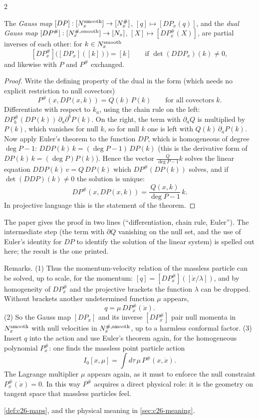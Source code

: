\begin{paracol}{2}
\begin{theorem}\label{thm:c29-gauss}
The \emph{Gauss map} $[DP]:[N^{\rm smooth}_x]\to[N^\#_x]$, $[q]\mapsto[DP_x(q)]$, and the \emph{dual Gauss map} $[DP^\#]:[N_x^{\#,\rm smooth}]\to[N_x]$, $[X]\mapsto[DP^\#_x(X)]$, are partial inverses of each other: for $k\in N^{\rm smooth}_x$
\[
  [DP^\#_x]\bigl([DP_x]([k])\bigr)=[k]\qquad\text{if }\det(DDP_x)(k)\ne0,
\]
and likewise with $P$ and $P^\#$ exchanged.
\end{theorem}
\begin{proof}
Write the defining property of the dual in the form (which needs no explicit restriction to null covectors)
\[
  P^\#(x,DP(x,k))=Q(k)\,P(k)\qquad\text{for all covectors }k.
\]
Differentiate with respect to $k_a$, using the chain rule on the left: $DP^\#_b(DP(k))\,\partial_a\partial^bP(k)$. On the right, the term with $\partial_aQ$ is multiplied by $P(k)$, which vanishes for null $k$, so for null $k$ one is left with $Q(k)\,\partial_aP(k)$. Now apply Euler's theorem to the function $DP$, which is homogeneous of degree $\deg P-1$: $DDP(k)\,k=(\deg P-1)\,DP(k)$ (this is the derivative form of $DP(k)\,k=(\deg P)P(k)$). Hence the vector $\frac{Q}{\deg P-1}k$ solves the linear equation $DDP(k)\,v=Q\,DP(k)$ which $DP^\#(DP(k))$ solves, and if $\det(DDP)(k)\ne0$ the solution is unique:
\[
  DP^\#(x,DP(x,k))=\frac{Q(x,k)}{\deg P-1}\,k.
\]
In projective language this is the statement of the theorem.
\end{proof}
\begin{coursenote}
The paper gives the proof in two lines (``differentiation, chain rule, Euler''). The intermediate step (the term with $\partial Q$ vanishing on the null set, and the use of Euler's identity for $DP$ to identify the solution of the linear system) is spelled out here; the result is the one printed.
\end{coursenote}

Remarks. (1) Thus the momentum-velocity relation of the massless particle can be solved, up to scale, for the momentum: $[q]=[DP^\#_x]([\dot x/\lambda])$, and by homogeneity of $DP^\#_x$ and the projective brackets the function $\lambda$ can be dropped. Without brackets another undetermined function $\mu$ appears,
\[
  q=\mu\,DP^\#_x(\dot x).
\]
(2) So the Gauss map $[DP_x]$ and its inverse $[DP^\#_x]$ pair null momenta in $N^{\rm smooth}_x$ with null velocities in $N^{\#,\rm smooth}_x$, up to a harmless conformal factor. (3) Insert $q$ into the action and use Euler's theorem again, for the homogeneous polynomial $P^\#_x$: one finds the massless point particle action
\[
  I_0[x,\mu]=\int d\tau\,\mu\,P^\#(x,\dot x).
\]
The Lagrange multiplier $\mu$ appears again, as it must to enforce the null constraint $P^\#_x(\dot x)=0$. In this way $P^\#$ acquires a direct physical role: it is the geometry on tangent space that massless particles feel.
\begin{recall}
\cref{def:c26-maps}, and the physical meaning in \cref{sec:c26-meaning}.
\end{recall}


\end{paracol}
